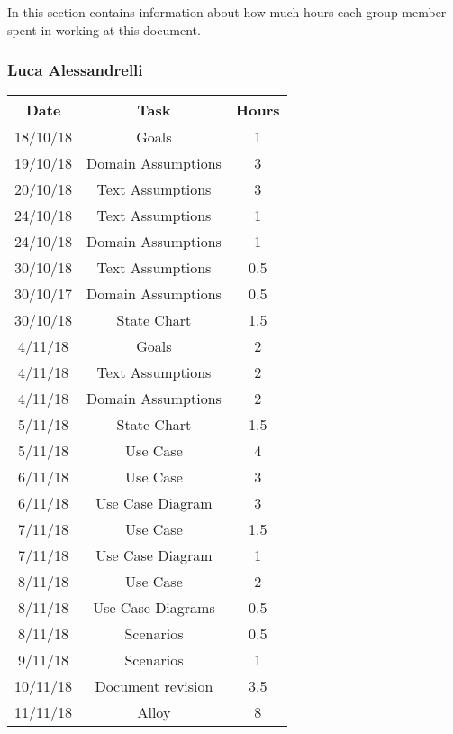 In this section contains information about how much hours each group member spent in working at this document.
\bigbreak

\subsubsection{Luca Alessandrelli}
\begin{table}[h]
\centering
\begin{tabular}{|c|c|c|}
\hline
\rowcolor[HTML]{FE996B} 
Date & Task & Hours 
\\ \hline
\rowcolor[HTML]{FFFC9E} 
18/10/18  & Goals & 1  
\\ \hline
\rowcolor[HTML]{FFFC9E} 
19/10/18 & Domain Assumptions & 3 
\\ \hline
\rowcolor[HTML]{FFFC9E}
20/10/18 & Text Assumptions & 3
\\ \hline
\rowcolor[HTML]{FFFC9E}
24/10/18 & Text Assumptions & 1
\\ \hline
\rowcolor[HTML]{FFFC9E}
24/10/18 & Domain Assumptions & 1
\\ \hline
\rowcolor[HTML]{FFFC9E}
30/10/18 & Text Assumptions & 0.5
\\ \hline
\rowcolor[HTML]{FFFC9E}
30/10/17 & Domain Assumptions & 0.5
\\ \hline
\rowcolor[HTML]{FFFC9E}
30/10/18 & State Chart & 1.5
\\ \hline
\rowcolor[HTML]{FFFC9E}
4/11/18 & Goals & 2
\\ \hline
\rowcolor[HTML]{FFFC9E}
4/11/18 & Text Assumptions & 2
\\ \hline
\rowcolor[HTML]{FFFC9E}
4/11/18 & Domain Assumptions & 2
\\ \hline
\rowcolor[HTML]{FFFC9E}
5/11/18 & State Chart & 1.5
\\ \hline
\rowcolor[HTML]{FFFC9E}
5/11/18 & Use Case & 4
\\ \hline
\rowcolor[HTML]{FFFC9E}
6/11/18 & Use Case & 3
\\ \hline
\rowcolor[HTML]{FFFC9E}
6/11/18 & Use Case Diagram & 3
\\ \hline
\rowcolor[HTML]{FFFC9E}
7/11/18 & Use Case & 1.5
\\ \hline
\rowcolor[HTML]{FFFC9E}
7/11/18 & Use Case Diagram & 1
\\ \hline
\rowcolor[HTML]{FFFC9E}
8/11/18 & Use Case & 2
\\ \hline
\rowcolor[HTML]{FFFC9E}
8/11/18 & Use Case Diagrams & 0.5
\\ \hline
\rowcolor[HTML]{FFFC9E}
8/11/18 & Scenarios & 0.5
\\ \hline
\rowcolor[HTML]{FFFC9E}
9/11/18 & Scenarios & 1
\\ \hline
\rowcolor[HTML]{FFFC9E}
10/11/18 & Document revision & 3.5
\\ \hline
\rowcolor[HTML]{FFFC9E}
11/11/18 & Alloy & 8
\\ \hline


\end{tabular}
\end{table}

